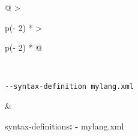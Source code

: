 \documentclass[
]{article}
\newenvironment{Shaded}{}{}
\newcommand{\AttributeTok}[1]{\textcolor[rgb]{0.49,0.56,0.16}{#1}}
\newcommand{\FunctionTok}[1]{\textcolor[rgb]{0.02,0.16,0.49}{#1}}
\newcommand{\KeywordTok}[1]{\textcolor[rgb]{0.00,0.44,0.13}{\textbf{#1}}}
\begin{document}
\begin{longtable}[]{@{}
  >{\raggedright\arraybackslash}p{(\columnwidth - 2\tabcolsep) * }
  >{\raggedright\arraybackslash}p{(\columnwidth - 2\tabcolsep) * }@{}}
\begin{minipage}[t]{\linewidth}
\begin{Shaded}
\begin{Highlighting}[]
\end{Highlighting}
\end{Shaded}
\end{minipage} \\
\begin{minipage}[t]{\linewidth}\raggedright
\begin{verbatim}
--syntax-definition mylang.xml
\end{verbatim}
\end{minipage} & \begin{minipage}[t]{\linewidth}\raggedright
\begin{Shaded}
\begin{Highlighting}[]
\FunctionTok{syntax{-}definitions}\KeywordTok{:}
\AttributeTok{  }\KeywordTok{{-}}\AttributeTok{ mylang.xml}
\end{Highlighting}
\end{Shaded}


\end{minipage}
\end{longtable}
\end{document}
